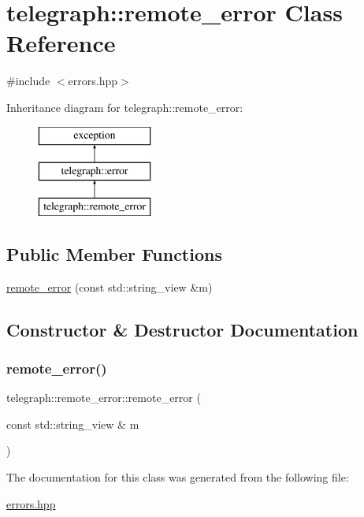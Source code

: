 \hypertarget{classtelegraph_1_1remote__error}{}\section{telegraph\+:\+:remote\+\_\+error Class Reference}
\label{classtelegraph_1_1remote__error}


{\ttfamily \#include $<$errors.\+hpp$>$}

Inheritance diagram for telegraph\+:\+:remote\+\_\+error\+:\begin{figure}[H]
\begin{center}
\leavevmode
\includegraphics[height=3.000000cm]{classtelegraph_1_1remote__error}
\end{center}
\end{figure}
\subsection*{Public Member Functions}
\begin{DoxyCompactItemize}
\item 
\hyperlink{classtelegraph_1_1remote__error_a9d7461b65c248393e6cb22bd243fc5c4}{remote\+\_\+error} (const std\+::string\+\_\+view \&m)
\end{DoxyCompactItemize}


\subsection{Constructor \& Destructor Documentation}
\mbox{\label{classtelegraph_1_1remote__error_a9d7461b65c248393e6cb22bd243fc5c4}} 
\subsubsection{\texorpdfstring{remote\+\_\+error()}{remote\_error()}}
{\footnotesize\ttfamily telegraph\+::remote\+\_\+error\+::remote\+\_\+error (\begin{DoxyParamCaption}\item[{const std\+::string\+\_\+view \&}]{m }\end{DoxyParamCaption})\hspace{0.3cm}{\ttfamily [inline]}}



The documentation for this class was generated from the following file\+:\begin{DoxyCompactItemize}
\item 
\hyperlink{errors_8hpp}{errors.\+hpp}\end{DoxyCompactItemize}
